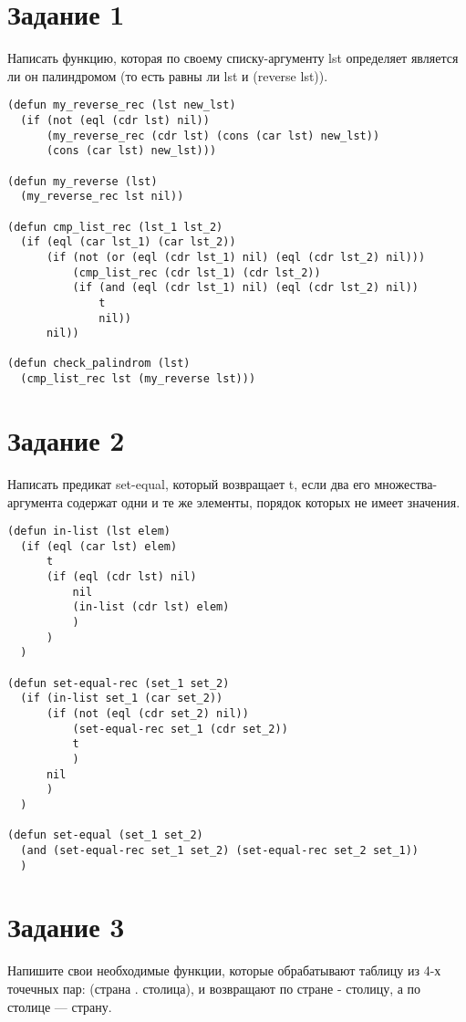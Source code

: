 \section{Задание 1}
Написать функцию, которая по своему списку-аргументу lst определяет является ли он палиндромом (то есть равны ли lst и (reverse lst)).

\begin{lstlisting}
(defun my_reverse_rec (lst new_lst)
  (if (not (eql (cdr lst) nil))
      (my_reverse_rec (cdr lst) (cons (car lst) new_lst))
      (cons (car lst) new_lst)))

(defun my_reverse (lst)
  (my_reverse_rec lst nil))

(defun cmp_list_rec (lst_1 lst_2)
  (if (eql (car lst_1) (car lst_2))
      (if (not (or (eql (cdr lst_1) nil) (eql (cdr lst_2) nil)))
          (cmp_list_rec (cdr lst_1) (cdr lst_2))
          (if (and (eql (cdr lst_1) nil) (eql (cdr lst_2) nil))
              t
              nil))
      nil))

(defun check_palindrom (lst)
  (cmp_list_rec lst (my_reverse lst)))
\end{lstlisting}

\section{Задание 2}
Написать предикат set-equal, который возвращает t, если два его множества-аргумента содержат одни и те же элементы, порядок которых не имеет значения.

\begin{lstlisting}
(defun in-list (lst elem)
  (if (eql (car lst) elem)
      t
      (if (eql (cdr lst) nil)
          nil
          (in-list (cdr lst) elem)
          )
      )
  )

(defun set-equal-rec (set_1 set_2)
  (if (in-list set_1 (car set_2))
      (if (not (eql (cdr set_2) nil))
          (set-equal-rec set_1 (cdr set_2))
          t
          )
      nil
      )
  )

(defun set-equal (set_1 set_2)
  (and (set-equal-rec set_1 set_2) (set-equal-rec set_2 set_1))
  )
\end{lstlisting}


\section{Задание 3}
Напишите свои необходимые функции, которые обрабатывают таблицу из 4-х точечных пар: (страна . столица), и возвращают по стране - столицу, а по столице — страну.

